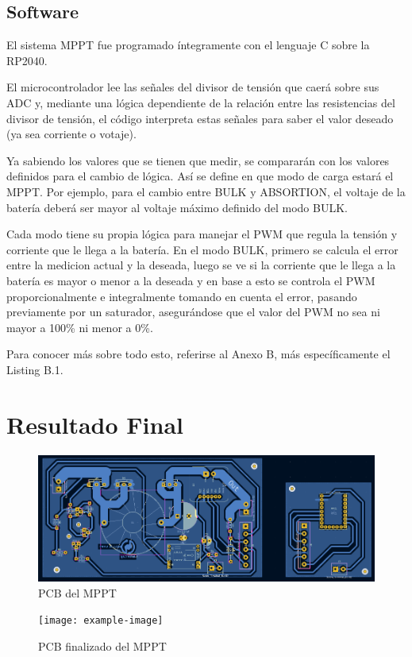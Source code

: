             \subsection{Software}
                El sistema MPPT fue programado íntegramente con el lenguaje C sobre la RP2040.\par
                El microcontrolador lee las señales del divisor de tensión que caerá sobre sus ADC y, mediante una lógica dependiente de la relación entre las resistencias del divisor de tensión, el código interpreta estas señales para saber el valor deseado (ya sea corriente o votaje).\par
                Ya sabiendo los valores que se tienen que medir, se compararán con los valores definidos para el cambio de lógica. Así se define en que modo de carga estará el MPPT. Por ejemplo, para el cambio entre BULK y ABSORTION, el voltaje de la batería deberá ser mayor al voltaje máximo definido del modo BULK.\par
                Cada modo tiene su propia lógica para manejar el PWM que regula la tensión y corriente que le llega a la batería. En el modo BULK, primero se calcula el error entre la medicion actual y la deseada, luego se ve si la corriente que le llega a la batería es mayor o menor a la deseada y en base a esto se controla el PWM proporcionalmente e integralmente tomando en cuenta el error, pasando previamente por un saturador, asegurándose que el valor del PWM no sea ni mayor a 100\% ni menor a 0\%.\par
                Para conocer más sobre todo esto, referirse al Anexo B, más específicamente el Listing B.1.
                
            \section{Resultado Final}
                \begin{figure}[H]
                    \centering
                    \includegraphics[width=0.8\linewidth]{Imagenes/MPPT/PCB - MPPT.jpg}
                    \caption{PCB del MPPT}
                    \label{fig:m5.1}
                \end{figure}

                \begin{figure}
                    \centering
                    \texttt{[image: example-image]}
                    \caption{PCB finalizado del MPPT}
                    \label{fig:m5.2}
                \end{figure}
